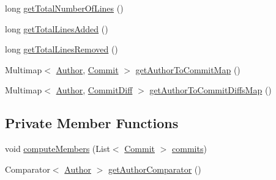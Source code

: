 \begin{DoxyCompactItemize}
\item 
long \hyperlink{classcom_1_1selesse_1_1gitwrapper_1_1analyzer_1_1_branch_details_a2139f8bb85331b7cb09cab717beefa81}{get\+Total\+Number\+Of\+Lines} ()
\item 
long \hyperlink{classcom_1_1selesse_1_1gitwrapper_1_1analyzer_1_1_branch_details_a6dcd7b97245632eded54cf6a8c3c6a6b}{get\+Total\+Lines\+Added} ()
\item 
long \hyperlink{classcom_1_1selesse_1_1gitwrapper_1_1analyzer_1_1_branch_details_a595a31a33a7f011a55d7bd6d41e580b9}{get\+Total\+Lines\+Removed} ()
\item 
Multimap$<$ \hyperlink{classcom_1_1selesse_1_1gitwrapper_1_1myobjects_1_1_author}{Author}, \hyperlink{classcom_1_1selesse_1_1gitwrapper_1_1myobjects_1_1_commit}{Commit} $>$ \hyperlink{classcom_1_1selesse_1_1gitwrapper_1_1analyzer_1_1_branch_details_a7e2b7df1c94963ec1f92265599337d15}{get\+Author\+To\+Commit\+Map} ()
\item 
Multimap$<$ \hyperlink{classcom_1_1selesse_1_1gitwrapper_1_1myobjects_1_1_author}{Author}, \hyperlink{classcom_1_1selesse_1_1gitwrapper_1_1myobjects_1_1_commit_diff}{Commit\+Diff} $>$ \hyperlink{classcom_1_1selesse_1_1gitwrapper_1_1analyzer_1_1_branch_details_a49f4e18287dce2956a9c1cad2cbc0a2b}{get\+Author\+To\+Commit\+Diffs\+Map} ()
\end{DoxyCompactItemize}
\subsection*{Private Member Functions}
\begin{DoxyCompactItemize}
\item 
void \hyperlink{classcom_1_1selesse_1_1gitwrapper_1_1analyzer_1_1_branch_details_a99e82494ecedc249e097a61492c8d150}{compute\+Members} (List$<$ \hyperlink{classcom_1_1selesse_1_1gitwrapper_1_1myobjects_1_1_commit}{Commit} $>$ \hyperlink{classcom_1_1selesse_1_1gitwrapper_1_1analyzer_1_1_branch_details_ac29ec5f3a2db01d208c465070dead2e8}{commits})
\item 
Comparator$<$ \hyperlink{classcom_1_1selesse_1_1gitwrapper_1_1myobjects_1_1_author}{Author} $>$ \hyperlink{classcom_1_1selesse_1_1gitwrapper_1_1analyzer_1_1_branch_details_a03b42ed9bf27d85f32c6d73eb2f0cf8d}{get\+Author\+Comparator} ()
\end{DoxyCompactItemize}
